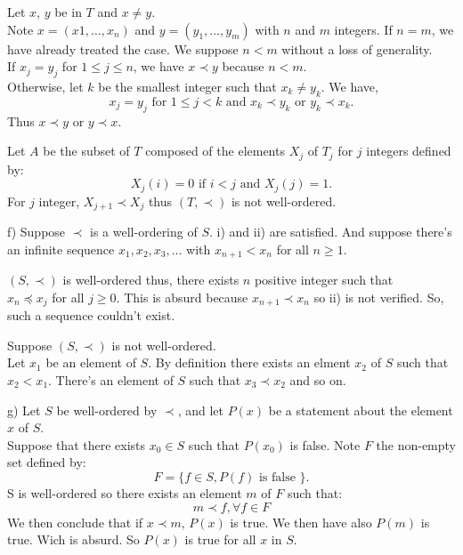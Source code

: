 \documentclass[a4paper,12pt]{article}
\begin{document}
\medskip
Let $x$, $y$ be in $T$ and $x \not= y$.\\
Note $x = (x1, \ldots, x_n)$ and $y = (y_1, \ldots, y_m)$ with $n$ and $m$ 
integers. If $n = m$, we have already treated the case.  We suppose $n < m$
without a loss of generality.\\
If $x_j = y_j$ for $1 \le j \le n$, we have $x \prec y$ because $n < m$.\\
Otherwise, let $k$ be the smallest integer such that $x_k \not= y_k$.  We have,
\[x_j = y_j \mbox{ for } 1 \le j < k \mbox{ and } x_k \prec y_k \mbox{ or }
y_k \prec x_k.\]
Thus $x \prec y$ or $y \prec x$.

\medskip
Let $A$ be the subset of $T$ composed of the elements $X_j$ of $T_j$ for $j$
integers defined by:
\[X_j(i) = 0 \mbox{ if } i < j \mbox{ and } X_j(j) = 1.\]
For $j$ integer, $X_{j+1} \prec X_j$ thus $(T, \prec)$ is not well-ordered.

\medskip
f) Suppose $\prec$ is a well-ordering  of $S$.  i) and ii) are satisfied.
And suppose there's an infinite sequence $x_1, x_2, x_3, \ldots$ with
$x_{n+1} < x_n$ for all $n \ge 1$.

$(S, \prec)$ is well-ordered thus, there exists $n$ positive integer such that\\
$x_n \preceq x_j$ for all $j \ge 0$.  This is absurd because $x_{n+1} \prec x_n$
so ii) is not verified.  So, such a sequence couldn't exist.

Suppose $(S, \prec)$ is not well-ordered.\\
Let $x_1$ be an element of $S$.  By definition there exists an elment $x_2$ of
$S$ such that $x_2 < x_1$.  There's an element of $S$ such that $x_3 \prec x_2$
and so on.

\medskip
g) Let $S$ be well-ordered by $\prec$, and let $P(x)$ be a statement about the
element $x$ of $S$.\\
Suppose that there exists $x_0 \in S$ such that $P(x_0)$ is false. Note $F$ the 
non-empty set defined by:
\[ F = \{ f \in S, P(f) \mbox{ is false } \} .\]
S is well-ordered so there exists an element $m$ of $F$ such that:
\[ m \prec f,  \forall f \in F\]
We then conclude that if $x \prec m$, $P(x)$ is true.  We then have also
$P(m)$ is true.  Wich is absurd.  So $P(x)$ is true for all $x$ in $S$. 
\end{document}
